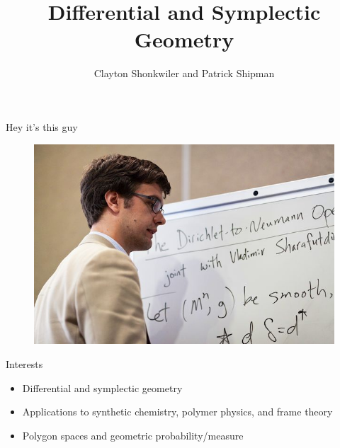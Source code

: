 \documentclass[usenames,dvipsnames]{beamer}
\title{Differential and Symplectic Geometry}
\subtitle{Clayton Shonkwiler and Patrick Shipman}
\theoremstyle{definition}
\theoremstyle{theorem}
\begin{document}
{
\begin{frame}
\titlepage
\end{frame}
}


    
    \begin{frame}{Hey it's this guy}
        \begin{figure}
            \centering
            \includegraphics[width=.8\textwidth]{clay.jpg}
        \end{figure}
    \end{frame}
    
    
    \begin{frame}{Interests}
        \begin{itemize}
            \item Differential and symplectic geometry
            \item Applications to synthetic chemistry, polymer physics, and frame theory
            \item Polygon spaces and geometric probability/measure
        \end{itemize}
    \end{frame}
\end{document}

